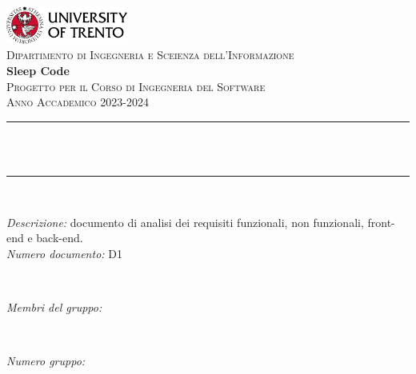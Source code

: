 \begin{titlepage}
\newcommand{\HRule}{\rule{\linewidth}{0.3mm}} %
\center %

\includegraphics[width=0.3\textwidth]{./unioftrento.png}\\[0.5cm]
\textsc{\Large Dipartimento di Ingegneria e Sceienza dell'Informazione}\\[1.5cm]

{\Huge\textbf{Sleep Code}}\\[0.5cm]
\textsc{\large Progetto per il Corso di Ingegneria del Software}\\
\textsc{\large Anno Accademico 2023-2024}\\[0.5cm]


\HRule\\[0.4cm]
{\huge\bfseries \@title}\\[0.1cm]
\HRule\\[1cm]

\begin{minipage}{\textwidth}
\begin{flushleft}
\textit{Descrizione:} documento di analisi dei requisiti funzionali, non funzionali, front-end e back-end.\\[0.5cm]
\textit{Numero documento:} D1
\end{flushleft}
\end{minipage}\\[1.5cm]

\begin{minipage}{0.4\textwidth}
\begin{flushleft}
\large
\textit{Membri del gruppo:}\\
\@author %
\end{flushleft}
\end{minipage}
~
\begin{minipage}{0.4\textwidth}
\begin{flushright}
\large
\textit{Numero gruppo: }
\groupNumber
\end{flushright}
\end{minipage}


\end{titlepage}
